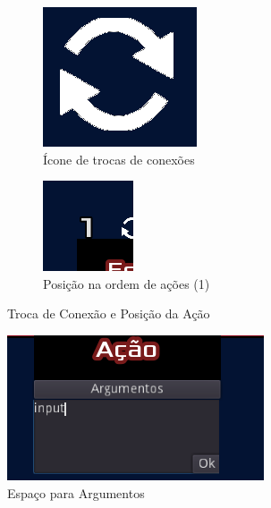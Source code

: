 \begin{figure}[H]
    \centering
    \begin{subfigure}{0.4\textwidth}
        \centering
        \includegraphics[width=.7\textwidth]{../figuras/change_button.png}
        \caption{Ícone de trocas de conexões}
    \end{subfigure}
    \begin{subfigure}{0.4\textwidth}
        \centering
        \includegraphics[width=.7\textwidth]{../figuras/numero_posicao.png}
        \caption{Posição na ordem de ações (1)}
    \end{subfigure}  
    \caption{Troca de Conexão e Posição da Ação}
\end{figure}

\begin{figure}[H]
    \includegraphics[scale=0.6]{../figuras/argumentos.png}
    \caption{Espaço para Argumentos}
\end{figure}

